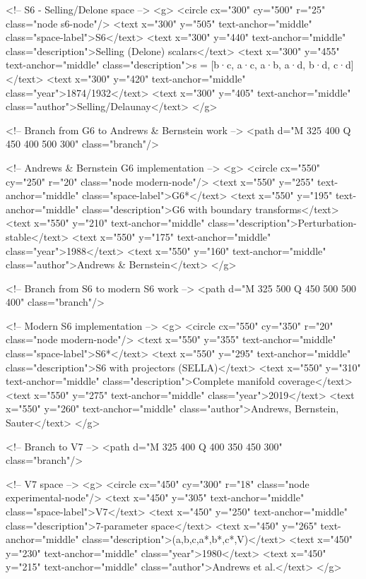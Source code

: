 <!-- S6 - Selling/Delone space -->
<g>
<circle cx="300" cy="500" r="25" class="node s6-node"/>
<text x="300" y="505" text-anchor="middle" class="space-label">S6</text>
<text x="300" y="440" text-anchor="middle" class="description">Selling (Delone) scalars</text>
<text x="300" y="455" text-anchor="middle" class="description">s = [b·c, a·c, a·b, a·d, b·d, c·d]</text>
<text x="300" y="420" text-anchor="middle" class="year">1874/1932</text>
<text x="300" y="405" text-anchor="middle" class="author">Selling/Delaunay</text>
</g>

<!-- Branch from G6 to Andrews & Bernstein work -->
<path d="M 325 400 Q 450 400 500 300" class="branch"/>

<!-- Andrews & Bernstein G6 implementation -->
<g>
<circle cx="550" cy="250" r="20" class="node modern-node"/>
<text x="550" y="255" text-anchor="middle" class="space-label">G6*</text>
<text x="550" y="195" text-anchor="middle" class="description">G6 with boundary transforms</text>
<text x="550" y="210" text-anchor="middle" class="description">Perturbation-stable</text>
<text x="550" y="175" text-anchor="middle" class="year">1988</text>
<text x="550" y="160" text-anchor="middle" class="author">Andrews & Bernstein</text>
</g>

<!-- Branch from S6 to modern S6 work -->
<path d="M 325 500 Q 450 500 500 400" class="branch"/>

<!-- Modern S6 implementation -->
<g>
<circle cx="550" cy="350" r="20" class="node modern-node"/>
<text x="550" y="355" text-anchor="middle" class="space-label">S6*</text>
<text x="550" y="295" text-anchor="middle" class="description">S6 with projectors (SELLA)</text>
<text x="550" y="310" text-anchor="middle" class="description">Complete manifold coverage</text>
<text x="550" y="275" text-anchor="middle" class="year">2019</text>
<text x="550" y="260" text-anchor="middle" class="author">Andrews, Bernstein, Sauter</text>
</g>

<!-- Branch to V7 -->
<path d="M 325 400 Q 400 350 450 300" class="branch"/>

<!-- V7 space -->
<g>
<circle cx="450" cy="300" r="18" class="node experimental-node"/>
<text x="450" y="305" text-anchor="middle" class="space-label">V7</text>
<text x="450" y="250" text-anchor="middle" class="description">7-parameter space</text>
<text x="450" y="265" text-anchor="middle" class="description">(a,b,c,a*,b*,c*,V)</text>
<text x="450" y="230" text-anchor="middle" class="year">1980</text>
<text x="450" y="215" text-anchor="middle" class="author">Andrews et al.</text>
</g>

